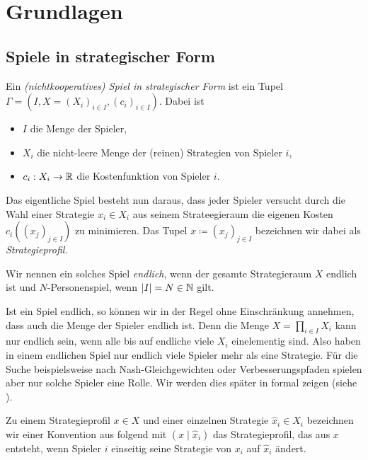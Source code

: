 \section{Grundlagen}\label{sec:Grundlagen}

\subsection{Spiele in strategischer Form}

\begin{defn}
	Ein \emph{(nichtkooperatives) Spiel in strategischer Form} ist ein Tupel $\Gamma = (I, X = (X_i)_{i \in I}, (c_i)_{i\in I})$. Dabei ist
	\begin{itemize}
		\item $I$ die Menge der Spieler,
		\item $X_i$ die nicht-leere Menge der (reinen) Strategien von Spieler $i$,
		\item $c_i: X_i \to \mathbb{R}$ die Kostenfunktion von Spieler $i$.
	\end{itemize}
	Das eigentliche Spiel besteht nun daraus, dass jeder Spieler versucht durch die Wahl einer Strategie $x_i \in X_i$ aus seinem Strateegieraum die eigenen Kosten $c_i((x_j)_{j \in I})$ zu minimieren. Das Tupel $x \coloneqq (x_j)_{j \in I}$ bezeichnen wir dabei als \emph{Strategieprofil}.
	
	Wir nennen ein solches Spiel \emph{endlich}, wenn der gesamte Strategieraum $X$ endlich ist und $N$-Personenspiel, wenn $\left|I\right| = N \in \mathbb{N}$ gilt.
\end{defn}

\begin{beob}\label{beob:endlicheSpiele}
	Ist ein Spiel endlich, so können wir in der Regel ohne Einschränkung annehmen, dass auch die Menge der Spieler endlich ist. Denn die Menge $X = \prod_{i\in I} X_i$ kann nur endlich sein, wenn alle bis auf endliche viele $X_i$ einelementig sind. Also haben in einem endlichen Spiel nur endlich viele Spieler mehr als eine Strategie. Für die Suche beispielsweise nach Nash-Gleichgewichten oder Verbesserungspfaden spielen aber nur solche Spieler eine Rolle. Wir werden dies später in  formal zeigen (siehe ).
\end{beob}

\begin{notation}
	Zu einem Strategieprofil $x \in X$ und einer einzelnen Strategie $\hat{x}_i \in X_i$ bezeichnen wir einer Konvention aus \cite{Polyequilibrium} folgend mit $(x \mid \hat{x}_i)$ das Strategieprofil, das aus $x$ entsteht, wenn Spieler $i$ einseitig seine Strategie von $x_i$ auf $\hat{x}_i$ ändert.
\end{notation}

